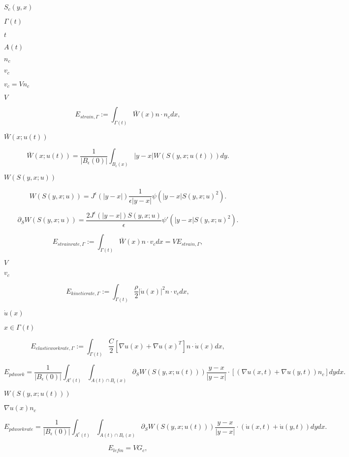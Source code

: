 \documentclass{article}
\begin{document}
$S_c(y,x)
$
\pagebreak

$ \Gamma(t) $
\pagebreak

$ t $
\pagebreak

$ A(t) $
\pagebreak

$ n_c$
\pagebreak

$
v_c $
\pagebreak

$ v_c = V n_c$
\pagebreak

$V $
\pagebreak

\[ E_{strain, \Gamma} :=
\int_{\Gamma(t)} \bar{W}(x) n \cdot n_c dx,
\]
\pagebreak

$ \bar{W}(x;u(t)) $
\pagebreak

\[ \bar{W}(x;u(t)) = \frac{1}{|B_\epsilon(0)|} \int_{B_\epsilon(x)}
|y-x| W(S(y,x;u(t))) dy.\]
\pagebreak

$ W(S(y,x;u)) $
\pagebreak

\[ W(S(y,x;u)) = J^\epsilon(|y-x|) \frac{1}{\epsilon |y-x|}
\psi(|y-x| S(y,x;u)^2). \]
\pagebreak

\[\partial_S W(S(y,x;u)) = \frac{2J^\epsilon(|y-x|) S(y,x;u)}{\epsilon}
\psi'(|y-x| S(y,x;u)^2). \]
\pagebreak

\[ E_{strain rate,
\Gamma} := \int_{\Gamma(t)}\bar{W}(x) n \cdot v_c dx = V E_{strain,
\Gamma}, \]
\pagebreak

$ V$
\pagebreak

$ v_c$
\pagebreak

\[ E_{kinetic rate,
\Gamma} := \int_{\Gamma(t)} \frac{\rho}{2} |\dot{u}(x)|^2 n \cdot
v_c dx, \]
\pagebreak

$ \dot{u}(x)$
\pagebreak

$ x \in \Gamma
(t) $
\pagebreak

\[
E_{elastic work rate, \Gamma} := \int_{\Gamma(t)} \frac{C}{2} [\nabla u
(x) + \nabla u(x)^T]n \cdot \dot{u}(x) dx , \]
\pagebreak

\[
E_{pd work} = \frac{1}{|B_\epsilon(0)|}
\int_{A^c(t)} \int_{A(t) \cap B_\epsilon(x)} \partial_S W(S(y,x;
u(t))) \frac{y-x}{|y-x|} \cdot [(\nabla {u}(x,t) + \nabla {u}(y,t)) n_c] dy
dx. \]
\pagebreak

$ W(S(y,x; u(t))) $
\pagebreak

$ \nabla u(x) n_c$
\pagebreak

\[
E_{pd work rate} = \frac{1}{|B_\epsilon(0)|}
\int_{A^c(t)} \int_{A(t) \cap B_\epsilon(x)} \partial_S W(S(y,x;
u(t))) \frac{y-x}{|y-x|} \cdot (\dot{u}(x,t) + \dot{u}(y,t)) dy dx. \]
\pagebreak

\[
E_{lefm} = V G_c, \]
\pagebreak
\end{document}
